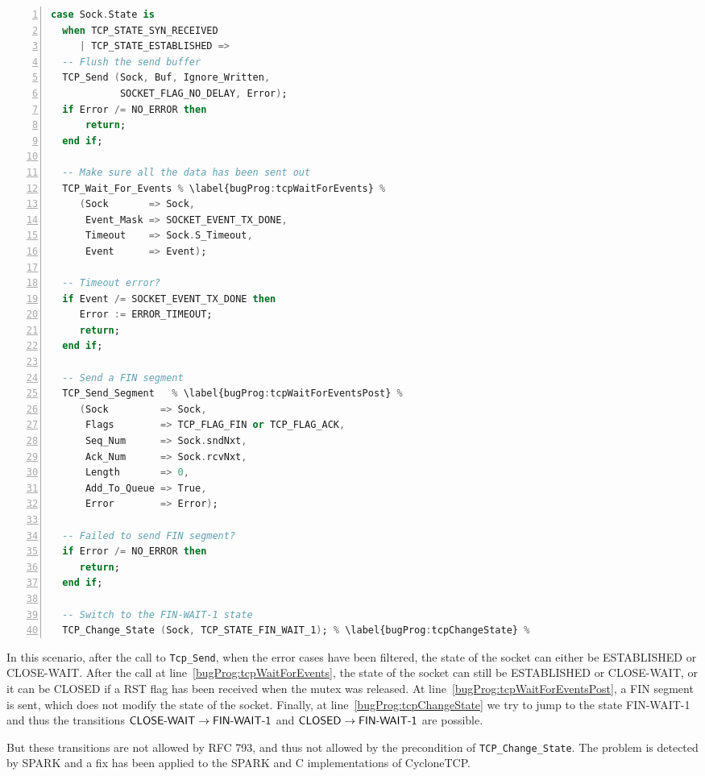 \documentclass[conference]{IEEEtran}
\def\spark#1{\lstinline[language=Ada]{#1}}
\def\state#1{\textsf{\MakeUppercase{#1}}\xspace}
\def\sclosed{\state{closed}}
\def\sestab{\state{established}}
\def\sfwone{\state{fin-wait-1}}
\def\sclosew{\state{close-wait}}
\def\flag#1{\textsf{#1}\xspace}
\def\rst{\flag{RST}}
\def\fin{\flag{FIN}}
\begin{document}
\begin{lstlisting}[language=Ada, basicstyle=\footnotesize\ttfamily,
                    numbers=left, numberstyle=\tiny, escapechar=\%]
case Sock.State is
  when TCP_STATE_SYN_RECEIVED
     | TCP_STATE_ESTABLISHED =>
  -- Flush the send buffer
  TCP_Send (Sock, Buf, Ignore_Written,
            SOCKET_FLAG_NO_DELAY, Error);
  if Error /= NO_ERROR then
      return;
  end if;

  -- Make sure all the data has been sent out
  TCP_Wait_For_Events % \label{bugProg:tcpWaitForEvents} %
     (Sock       => Sock,
      Event_Mask => SOCKET_EVENT_TX_DONE,
      Timeout    => Sock.S_Timeout,
      Event      => Event);

  -- Timeout error?
  if Event /= SOCKET_EVENT_TX_DONE then
     Error := ERROR_TIMEOUT;
     return;
  end if;

  -- Send a FIN segment
  TCP_Send_Segment   % \label{bugProg:tcpWaitForEventsPost} %
     (Sock         => Sock,
      Flags        => TCP_FLAG_FIN or TCP_FLAG_ACK,
      Seq_Num      => Sock.sndNxt,
      Ack_Num      => Sock.rcvNxt,
      Length       => 0,
      Add_To_Queue => True,
      Error        => Error);

  -- Failed to send FIN segment?
  if Error /= NO_ERROR then
     return;
  end if;

  -- Switch to the FIN-WAIT-1 state
  TCP_Change_State (Sock, TCP_STATE_FIN_WAIT_1); % \label{bugProg:tcpChangeState} %
\end{lstlisting}

In this scenario, after the call to \spark{Tcp_Send}, when the error cases have
been filtered, the state of the socket can either be \sestab or \sclosew. After the call
at line~\ref{bugProg:tcpWaitForEvents}, the state of the socket can
still be \sestab or \sclosew, or it can be \sclosed if a \rst flag has been received when the mutex
was released.
At line~\ref{bugProg:tcpWaitForEventsPost}, a \fin segment is sent, which does
not modify the state of the socket. Finally, at line~\ref{bugProg:tcpChangeState}
we try to jump to the state \sfwone and thus the transitions $\text{\sclosew}
\rightarrow \text{\sfwone}$ and $\text{\sclosed} \rightarrow \text{\sfwone}$ are
possible.

But these transitions are not allowed by RFC 793, and thus not allowed by the
precondition of \spark{TCP_Change_State}. The problem is detected by SPARK and a fix
has been applied to the SPARK and C implementations of CycloneTCP.

\end{document}
